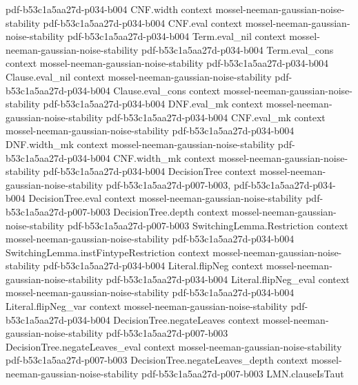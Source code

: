\begin{theorem}
  {pdf-b53c1a5aa27d-p034-b004}
\proofstep
  {CNF.width}
  {context}
  {mossel-neeman-gaussian-noise-stability}
  {pdf-b53c1a5aa27d-p034-b004}
\proofstep
  {CNF.eval}
  {context}
  {mossel-neeman-gaussian-noise-stability}
  {pdf-b53c1a5aa27d-p034-b004}
\proofstep
  {Term.eval_nil}
  {context}
  {mossel-neeman-gaussian-noise-stability}
  {pdf-b53c1a5aa27d-p034-b004}
\proofstep
  {Term.eval_cons}
  {context}
  {mossel-neeman-gaussian-noise-stability}
  {pdf-b53c1a5aa27d-p034-b004}
\proofstep
  {Clause.eval_nil}
  {context}
  {mossel-neeman-gaussian-noise-stability}
  {pdf-b53c1a5aa27d-p034-b004}
\proofstep
  {Clause.eval_cons}
  {context}
  {mossel-neeman-gaussian-noise-stability}
  {pdf-b53c1a5aa27d-p034-b004}
\proofstep
  {DNF.eval_mk}
  {context}
  {mossel-neeman-gaussian-noise-stability}
  {pdf-b53c1a5aa27d-p034-b004}
\proofstep
  {CNF.eval_mk}
  {context}
  {mossel-neeman-gaussian-noise-stability}
  {pdf-b53c1a5aa27d-p034-b004}
\proofstep
  {DNF.width_mk}
  {context}
  {mossel-neeman-gaussian-noise-stability}
  {pdf-b53c1a5aa27d-p034-b004}
\proofstep
  {CNF.width_mk}
  {context}
  {mossel-neeman-gaussian-noise-stability}
  {pdf-b53c1a5aa27d-p034-b004}
\proofstep
  {DecisionTree}
  {context}
  {mossel-neeman-gaussian-noise-stability}
  {pdf-b53c1a5aa27d-p007-b003,
    pdf-b53c1a5aa27d-p034-b004}
\proofstep
  {DecisionTree.eval}
  {context}
  {mossel-neeman-gaussian-noise-stability}
  {pdf-b53c1a5aa27d-p007-b003}
\proofstep
  {DecisionTree.depth}
  {context}
  {mossel-neeman-gaussian-noise-stability}
  {pdf-b53c1a5aa27d-p007-b003}
\proofstep
  {SwitchingLemma.Restriction}
  {context}
  {mossel-neeman-gaussian-noise-stability}
  {pdf-b53c1a5aa27d-p034-b004}
\proofstep
  {SwitchingLemma.instFintypeRestriction}
  {context}
  {mossel-neeman-gaussian-noise-stability}
  {pdf-b53c1a5aa27d-p034-b004}
\proofstep
  {Literal.flipNeg}
  {context}
  {mossel-neeman-gaussian-noise-stability}
  {pdf-b53c1a5aa27d-p034-b004}
\proofstep
  {Literal.flipNeg_eval}
  {context}
  {mossel-neeman-gaussian-noise-stability}
  {pdf-b53c1a5aa27d-p034-b004}
\proofstep
  {Literal.flipNeg_var}
  {context}
  {mossel-neeman-gaussian-noise-stability}
  {pdf-b53c1a5aa27d-p034-b004}
\proofstep
  {DecisionTree.negateLeaves}
  {context}
  {mossel-neeman-gaussian-noise-stability}
  {pdf-b53c1a5aa27d-p007-b003}
\proofstep
  {DecisionTree.negateLeaves_eval}
  {context}
  {mossel-neeman-gaussian-noise-stability}
  {pdf-b53c1a5aa27d-p007-b003}
\proofstep
  {DecisionTree.negateLeaves_depth}
  {context}
  {mossel-neeman-gaussian-noise-stability}
  {pdf-b53c1a5aa27d-p007-b003}
\proofstep
  {LMN.clauseIsTaut}

\end{theorem}
